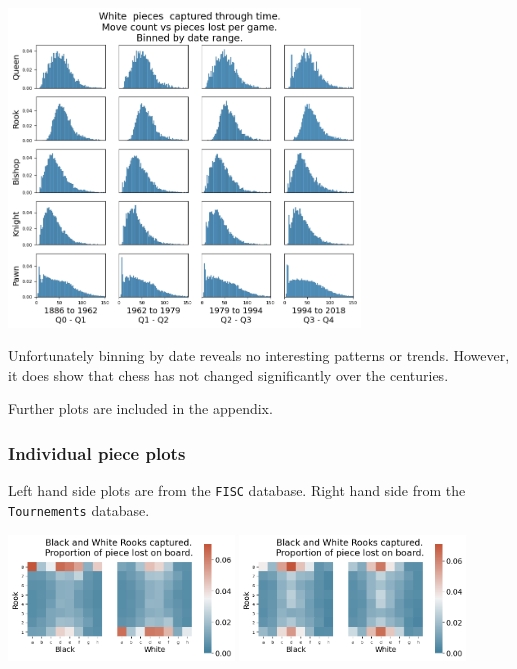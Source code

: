 \documentclass[11pt]{article}
\begin{document}
\begin{center}
\includegraphics[width=0.7\textwidth]{Images/_HIST_Queen_Rook_Bishop_Knight_Pawn_WHITE_DATE_TOURNEMENTS.png}
\end{center}

Unfortunately binning by date reveals no interesting patterns or trends. However, it does show that chess has not changed significantly over the centuries.

Further plots are included in the appendix.

\subsubsection{Individual piece plots}
\label{sec:org272179c}
Left hand side plots are from the \texttt{FISC} database. Right hand side from the \texttt{Tournements} database.
\begin{center}
\includegraphics[width=0.45\textwidth]{Images/_HEATMAP_Rook_FISC.png}
\includegraphics[width=0.45\textwidth]{Images/_HEATMAP_Rook_TOURNEMENTS.png}
\end{center}
\end{document}
